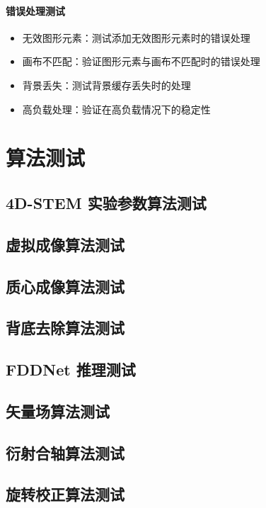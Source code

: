\documentclass[a4paper,12pt]{report}	%
\begin{document}
\paragraph{错误处理测试}
\begin{itemize}
    \item 无效图形元素：测试添加无效图形元素时的错误处理
    \item 画布不匹配：验证图形元素与画布不匹配时的错误处理
    \item 背景丢失：测试背景缓存丢失时的处理
    \item 高负载处理：验证在高负载情况下的稳定性
\end{itemize}

\section{算法测试}

\subsection{4D-STEM 实验参数算法测试}

\subsection{虚拟成像算法测试}

\subsection{质心成像算法测试}

\subsection{背底去除算法测试}

\subsection{FDDNet 推理测试}

\subsection{矢量场算法测试}

\subsection{衍射合轴算法测试}

\subsection{旋转校正算法测试}
\end{document}
